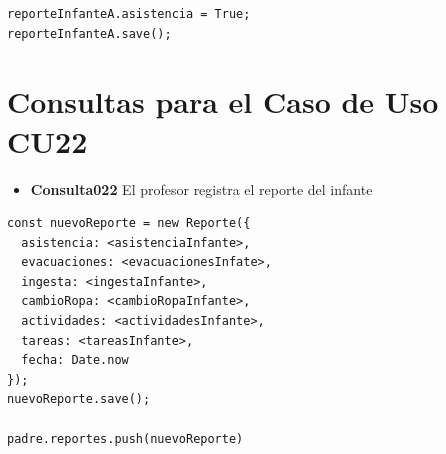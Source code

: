 \begin{verbatim}
reporteInfanteA.asistencia = True;
reporteInfanteA.save();
\end{verbatim}

\section{Consultas para el Caso de Uso CU22}

\begin{itemize}
    \item \textbf{Consulta022} El profesor registra el reporte del infante
\end{itemize}

\begin{verbatim}
const nuevoReporte = new Reporte({
  asistencia: <asistenciaInfante>,
  evacuaciones: <evacuacionesInfate>,
  ingesta: <ingestaInfante>,
  cambioRopa: <cambioRopaInfante>,
  actividades: <actividadesInfante>,
  tareas: <tareasInfante>,
  fecha: Date.now
});
nuevoReporte.save();

padre.reportes.push(nuevoReporte)
\end{verbatim}
